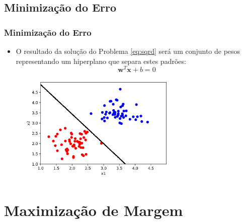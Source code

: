 \documentclass{beamer}
\begin{document}
\subsection{Minimização do Erro}

\begin{frame}
	\frametitle{Minimização do Erro}
	\begin{itemize}
		\item O resultado da solução do Problema \ref{eq:sqrd} será um conjunto de pesos representando um hiperplano que separa estes padrões:
		\begin{equation}
	 		\textbf{w}^T\textbf{x} + b = 0
	 		\label{eq:plano}
 		\end{equation}
	\end{itemize}
	\begin{figure}[h!]
		\centering
		\includegraphics[width=3.0in]{fig02.png}
		\label{fig:plano-mse}
	\end{figure}
\end{frame}

\section{Maximização de Margem}
\end{document}
